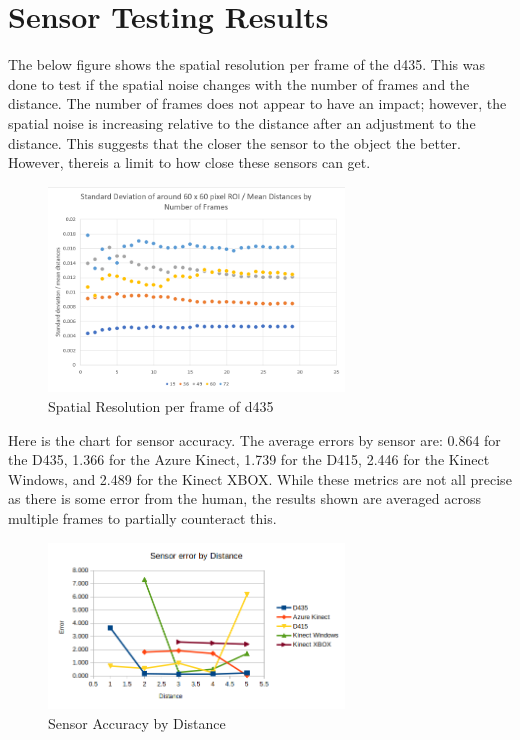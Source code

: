 \section{Sensor Testing Results}
The below figure shows the spatial resolution per frame of the d435. This was done to test if the spatial noise changes with the number of frames and the distance. The number of frames does not appear to have an impact; however, the spatial noise is increasing relative to the distance after an adjustment to the distance. This suggests that the closer the sensor to the object the better. However, thereis a limit to how close these sensors can get.
\begin{figure}[!htb]
	\caption{Spatial Resolution per frame of d435}
	\centering
	\includegraphics[width=0.7\textwidth]{images/d435_spatial_resolution.png}
\end{figure}

Here is the chart for sensor accuracy. The average errors by sensor are: 0.864 for the D435, 1.366 for the Azure Kinect, 1.739 for the D415, 2.446 for the Kinect Windows, and 2.489 for the Kinect XBOX. While these metrics are not all precise as there is some error from the human, the results shown are averaged across multiple frames to partially counteract this.
\begin{figure}[!htb]
	\caption{Sensor Accuracy by Distance}
	\centering
	\includegraphics[width=0.7\textwidth]{images/sensor_accuracy.png}
\end{figure}

